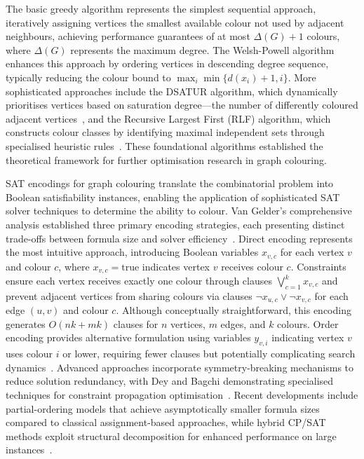 The basic greedy algorithm represents the simplest sequential approach, iteratively assigning vertices the smallest available colour not used by adjacent neighbours, achieving performance guarantees of at most $\Delta(G) + 1$ colours, where $\Delta(G)$ represents the maximum degree. The Welsh-Powell algorithm enhances this approach by ordering vertices in descending degree sequence, typically reducing the colour bound to $\max_i \min\{d(x_i) + 1, i\}$. More sophisticated approaches include the DSATUR algorithm, which dynamically prioritises vertices based on saturation degree---the number of differently coloured adjacent vertices~\cite{brelaz1979new}, and the Recursive Largest First (RLF) algorithm, which constructs colour classes by identifying maximal independent sets through specialised heuristic rules~\cite{leighton1979graph}. These foundational algorithms established the theoretical framework for further optimisation research in graph colouring.

SAT encodings for graph colouring translate the combinatorial problem into Boolean satisfiability instances, enabling the application of sophisticated SAT solver techniques to determine the ability to colour. Van Gelder's comprehensive analysis established three primary encoding strategies, each presenting distinct trade-offs between formula size and solver efficiency~\cite{vangelder2008another}.
Direct encoding represents the most intuitive approach, introducing Boolean variables $x_{v,c}$ for each vertex $v$ and colour $c$, where $x_{v,c} = \text{true}$ indicates vertex $v$ receives colour $c$. Constraints ensure each vertex receives exactly one colour through clauses $\bigvee_{c=1}^k x_{v,c}$ and prevent adjacent vertices from sharing colours via clauses $\neg x_{u,c} \vee \neg x_{v,c}$ for each edge $(u,v)$ and colour $c$. Although conceptually straightforward, this encoding generates $O(nk + mk)$ clauses for $n$ vertices, $m$ edges, and $k$ colours.
Order encoding provides alternative formulation using variables $y_{v,i}$ indicating vertex $v$ uses colour $i$ or lower, requiring fewer clauses but potentially complicating search dynamics~\cite{faber2024sat}. Advanced approaches incorporate symmetry-breaking mechanisms to reduce solution redundancy, with Dey and Bagchi demonstrating specialised techniques for constraint propagation optimisation~\cite{dey2013satisfiability}. Recent developments include partial-ordering models that achieve asymptotically smaller formula sizes compared to classical assignment-based approaches, while hybrid CP/SAT methods exploit structural decomposition for enhanced performance on large instances~\cite{hebrard2018clause}.

